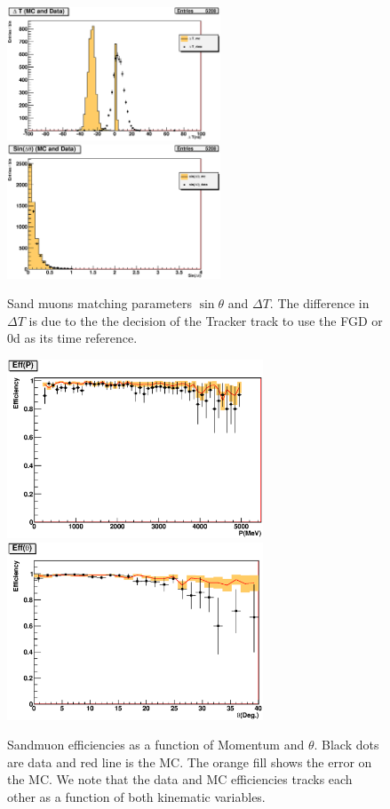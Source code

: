 \begin{figure}
\centering
\includegraphics[width=2.5in]{Figures/Systematics/SandMuonEfficiencyPlots/C_37.eps}
\includegraphics[width=2.5in]{Figures/Systematics/SandMuonEfficiencyPlots/C_42.eps}
\caption{Sand muons matching parameters \(\sin \theta\) and \(\Delta T\). 
The difference in \(\Delta T\) is due to the the decision of 
the Tracker track to use the FGD or \p0d as its time reference.} 
\label{fig:dS_dT}
\end{figure}

\begin{figure}
\centering
\includegraphics[width=3in]{Figures/Systematics/SandMuonEfficiencyPlots/C_52.eps}
\includegraphics[width=3in]{Figures/Systematics/SandMuonEfficiencyPlots/C_51.eps}
\caption{\label{fig:eff(p)_eff(theta)}Sandmuon efficiencies as a function of Momentum and \(\theta\). Black dots are data and red line is the MC. The orange fill shows the error on the MC. We note that the data and MC efficiencies tracks each other as a function of both kinematic variables.}
\end{figure}


